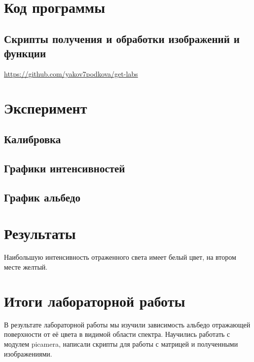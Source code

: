 \documentclass[a4paper,12pt]{article} %
\begin{document}
\section{Код программы}

\subsection{Скрипты получения и обработки изображений и функции}
\url{https://github.com/yakov7podkova/get-labs}
\section{Эксперимент}
\subsection{Калибровка}

\begin{figure}[h]
\end{figure}

\clearpage
\subsection{Графики интенсивностей}

\begin{figure}[h]
\end{figure}

\subsection{График альбедо}

\begin{figure}[h]
   
\end{figure}

\section{Результаты}
Наибольшую интенсивность отраженного света имеет белый цвет, на втором месте желтый.
\section{Итоги лабораторной работы}
В результате лабораторной работы мы изучили зависимость альбедо отражающей поверхности от её цвета в видимой области спектра. Научились работать с модулем picamera, написали скрипты для работы с матрицей и полученными изображениями.

 
\end{document}
